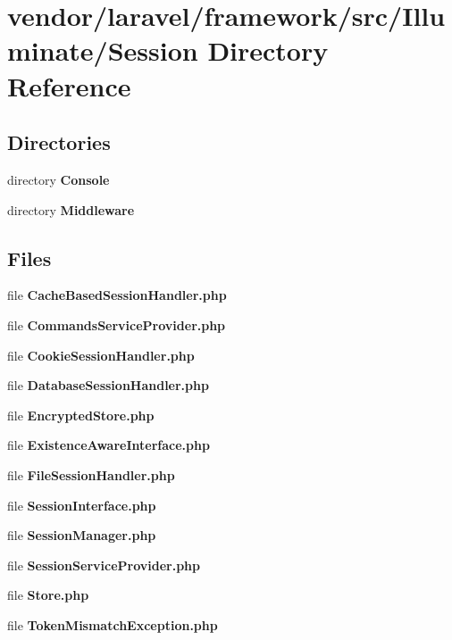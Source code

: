 \section{vendor/laravel/framework/src/\+Illuminate/\+Session Directory Reference}
\label{dir_33f68717f6f78f54cab7d81530b259b8}
\subsection*{Directories}
\begin{DoxyCompactItemize}
\item 
directory {\bf Console}
\item 
directory {\bf Middleware}
\end{DoxyCompactItemize}
\subsection*{Files}
\begin{DoxyCompactItemize}
\item 
file {\bf Cache\+Based\+Session\+Handler.\+php}
\item 
file {\bf Commands\+Service\+Provider.\+php}
\item 
file {\bf Cookie\+Session\+Handler.\+php}
\item 
file {\bf Database\+Session\+Handler.\+php}
\item 
file {\bf Encrypted\+Store.\+php}
\item 
file {\bf Existence\+Aware\+Interface.\+php}
\item 
file {\bf File\+Session\+Handler.\+php}
\item 
file {\bf Session\+Interface.\+php}
\item 
file {\bf Session\+Manager.\+php}
\item 
file {\bf Session\+Service\+Provider.\+php}
\item 
file {\bf Store.\+php}
\item 
file {\bf Token\+Mismatch\+Exception.\+php}
\end{DoxyCompactItemize}

